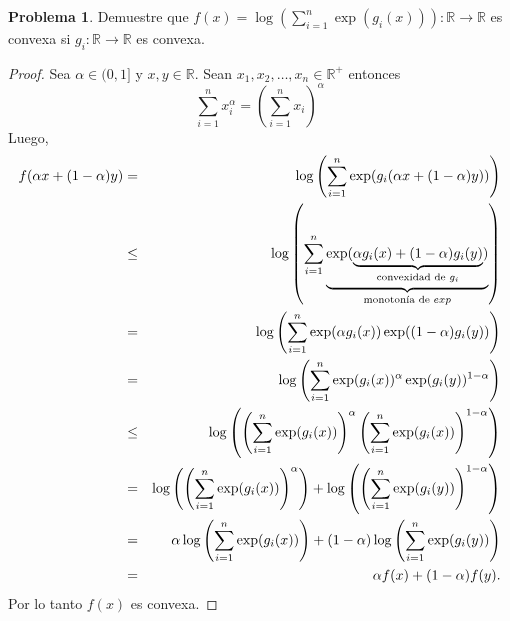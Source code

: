 \documentclass[12pt,letterpaper]{article}
\theoremstyle{definition}
\newtheorem{problm}{Problema}
\begin{document}
\begin{problm}
	Demuestre que $ f (x) = \log \left( \displaystyle \sum_{i = 1}^{n} \exp(g_i(x)) \right) : \mathbb{R} \to \mathbb{R} $ es convexa si $ g_i :\mathbb{R} \to \mathbb{R} $ es convexa. 
	\begin{proof}
		Sea $ \alpha \in (0,1] $ y $ x,y \in \mathbb{R} $. Sean $ x_1, x_2, \dots, x_n \in \mathbb{R}^{+} $ entonces
		\begin{equation}\label{exp}
			\sum_{i = 1}^{n} x_i^{\alpha} = \left( \sum_{i = 1}^n x_i \right)^\alpha
		\end{equation}  
		Luego,
		\begin{eqnarray*}
			f( \alpha x + (1 - \alpha)y) & = & \log \left( \sum_{i = 1}^n \exp (g_i (\alpha x + ( 1 - \alpha) y)) \right) \\
			& \leq & \log \left( \sum_{i = 1}^n \underbrace{\exp ( \underbrace{\alpha g_i (x) + ( 1 - \alpha) g_i(y)}_{\textup{convexidad de } g_i })}_{\textup{monotonía de }exp} \right) \\
			& = & \log \left( \sum_{i = 1}^n \exp ( \alpha g_i ( x)) \exp(( 1 - \alpha) g_i(y)) \right) \\
			& = & \log \left( \sum_{i = 1}^n \exp (g_i ( x))^{\alpha} \exp(g_i(y))^{1-\alpha} \right) \\
			& \leq & \log \left( \left( \sum_{i = 1}^n \exp (g_i ( x))\right)^{\alpha} \left( \sum_{i = 1}^n \exp (g_i ( x))\right)^{1 - \alpha} \right) \\
			& = & \log \left( \left( \sum_{i = 1}^n \exp (g_i ( x))\right)^{\alpha} \right) + \log \left( \left( \sum_{i = 1}^n \exp (g_i ( y))\right)^{1 - \alpha} \right) \\
			& = & \alpha\log \left( \sum_{i = 1}^n \exp (g_i ( x))\right) + (1 - \alpha) \log \left(  \sum_{i = 1}^n \exp (g_i ( y))\right) \\
			& = & \alpha f(x) + (1 - \alpha) f(y).
		\end{eqnarray*}
	Por lo tanto $ f(x) $ es convexa.
	\end{proof}
\end{problm}
\end{document}
